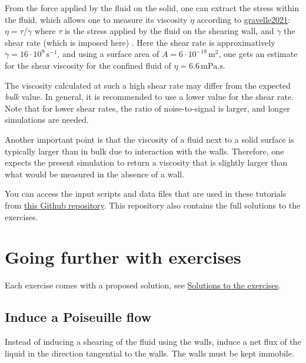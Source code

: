 \vspace{0.25cm} \noindent From the force applied by the fluid on the solid, one can
extract the stress within the fluid, which allows one to
measure its viscosity $\dot{\eta}$ 
according to \href{https://pure.tudelft.nl/ws/portalfiles/portal/89280267/PhysRevFluids.6.034303.pdf}{gravelle2021}:
$\eta = \tau / \dot{\gamma}$ where $\tau$
is the stress applied by the fluid on the shearing wall, and
$\dot{\gamma}$ the shear rate (which is imposed
here) \cite{gravelle2021violations}. Here the shear rate
is approximatively $\dot{\gamma} = 16 \cdot 10^9\,\text{s}^{-1}$,
and using a surface area of $A = 6 \cdot 10^{-18}\,\text{m}^2$, one
gets an estimate for the shear viscosity for the confined
fluid of $\eta = 6.6\,\text{mPa.s}$.

\vspace{0.25cm} \noindent The viscosity calculated at such a high shear rate may
differ from the expected \textit{bulk} value. In general, it is recommended to use a lower
value for the shear rate. Note that for lower shear rates, the ratio of noise-to-signal
is larger, and longer simulations are needed.

\vspace{0.25cm} \noindent Another important point is that the viscosity of a fluid next to a solid surface is
typically larger than in bulk due to interaction with the
walls. Therefore, one expects the present simulation to return 
a viscosity that is slightly larger than what would
be measured in the absence of a wall.

\vspace{0.25cm} \noindent You can access the input scripts and data files that
are used in these tutorials from \href{https://github.com/lammpstutorials/lammpstutorials-inputs/}{this Github repository}.
This repository also contains the full solutions to the exercises.

\section{Going further with exercises}
\noindent Each exercise comes with a proposed solution, 
see \hyperref[solutions-label]{Solutions to the exercises}.

\subsection{Induce a Poiseuille flow}
\noindent Instead of inducing a shearing of the fluid using the walls,
induce a net flux of the liquid in the direction tangential
to the walls. The walls must be kept immobile.

